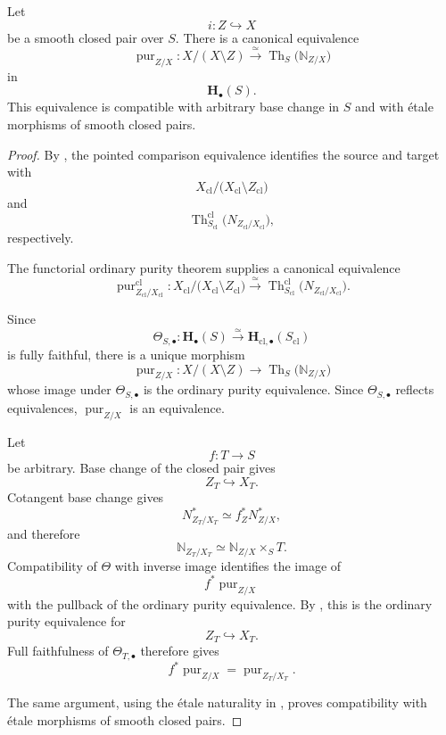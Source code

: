 \begin{theorem}
\label{thm:brave-new-homotopy-purity}
Let
\[
    i
    \colon
    Z
    \hookrightarrow
    X
\]
be a smooth closed pair over \(S\).  There is a canonical equivalence
\[
    \operatorname{pur}_{Z/X}
    \colon
    X/(X\setminus Z)
    \xrightarrow{\simeq}
    \operatorname{Th}_S
    \bigl(
        \mathbb N_{Z/X}
    \bigr)
\]
in
\[
    \mathbf H_\bullet(S).
\]
This equivalence is compatible with arbitrary base change in \(S\) and
with étale morphisms of smooth closed pairs.
\end{theorem}

\begin{proof}
By
,
the pointed comparison equivalence identifies the source and target
with
\[
    X_{\mathrm{cl}}/
    \bigl(
        X_{\mathrm{cl}}\setminus Z_{\mathrm{cl}}
    \bigr)
\]
and
\[
    \operatorname{Th}^{\mathrm{cl}}_{S_{\mathrm{cl}}}
    \bigl(
        N_{Z_{\mathrm{cl}}/X_{\mathrm{cl}}}
    \bigr),
\]
respectively.

The functorial ordinary purity theorem
supplies a canonical equivalence
\[
    \operatorname{pur}^{\mathrm{cl}}_{Z_{\mathrm{cl}}/X_{\mathrm{cl}}}
    \colon
    X_{\mathrm{cl}}/
    \bigl(
        X_{\mathrm{cl}}\setminus Z_{\mathrm{cl}}
    \bigr)
    \xrightarrow{\simeq}
    \operatorname{Th}^{\mathrm{cl}}_{S_{\mathrm{cl}}}
    \bigl(
        N_{Z_{\mathrm{cl}}/X_{\mathrm{cl}}}
    \bigr).
\]

Since
\[
    \Theta_{S,\bullet}
    \colon
    \mathbf H_\bullet(S)
    \xrightarrow{\simeq}
    \mathbf H_{\mathrm{cl},\bullet}(S_{\mathrm{cl}})
\]
is fully faithful, there is a unique morphism
\[
    \operatorname{pur}_{Z/X}
    \colon
    X/(X\setminus Z)
    \longrightarrow
    \operatorname{Th}_S
    \bigl(
        \mathbb N_{Z/X}
    \bigr)
\]
whose image under \(\Theta_{S,\bullet}\) is the ordinary purity
equivalence.  Since \(\Theta_{S,\bullet}\) reflects equivalences,
\(\operatorname{pur}_{Z/X}\) is an equivalence.

Let
\[
    f
    \colon
    T
    \longrightarrow
    S
\]
be arbitrary.  Base change of the closed pair gives
\[
    Z_T
    \hookrightarrow
    X_T.
\]
Cotangent base change gives
\[
    N^*_{Z_T/X_T}
    \simeq
    f_Z^*N^*_{Z/X},
\]
and therefore
\[
    \mathbb N_{Z_T/X_T}
    \simeq
    \mathbb N_{Z/X}\times_ST.
\]
Compatibility of \(\Theta\) with inverse image identifies the image of
\[
    f^*\operatorname{pur}_{Z/X}
\]
with the pullback of the ordinary purity equivalence.  By
,
this is the ordinary purity equivalence for
\[
    Z_T
    \hookrightarrow
    X_T.
\]
Full faithfulness of \(\Theta_{T,\bullet}\) therefore gives
\[
    f^*\operatorname{pur}_{Z/X}
    =
    \operatorname{pur}_{Z_T/X_T}.
\]

The same argument, using the étale naturality in
,
proves compatibility with étale morphisms of smooth closed pairs.
\end{proof}

